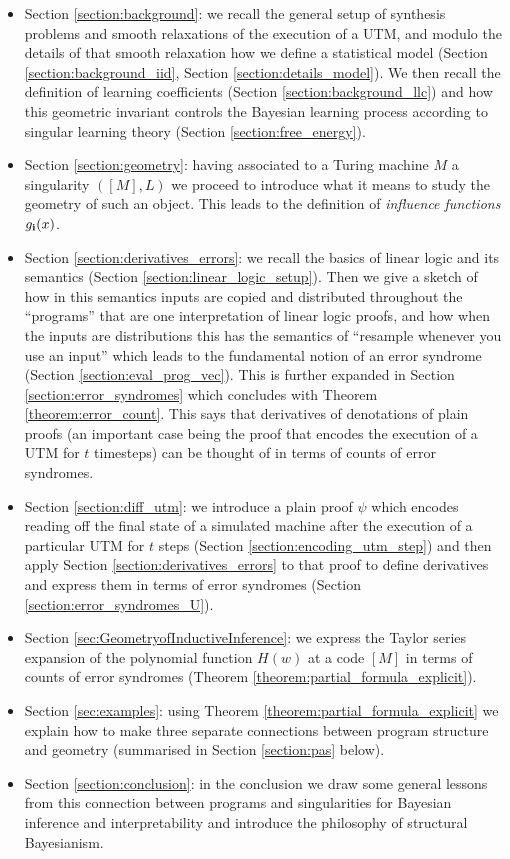 \documentclass[english,letter paper,12pt,reqno]{article}
\theoremstyle{definition}
\begin{document}
\begin{itemize}
    \item Section \ref{section:background}: we recall the general setup of synthesis problems and smooth relaxations of the execution of a UTM, and modulo the details of that smooth relaxation how we define a statistical model (Section \ref{section:background_iid}, Section \ref{section:details_model}). We then recall the definition of learning coefficients (Section \ref{section:background_llc}) and how this geometric invariant controls the Bayesian learning process according to singular learning theory (Section \ref{section:free_energy}).
    \item Section \ref{section:geometry}: having associated to a Turing machine $M$ a singularity $([M], L)$ we proceed to introduce what it means to study the geometry of such an object. This leads to the definition of \emph{influence functions} $g_{\bold{i}}(x)$.
    \item Section \ref{section:derivatives_errors}: we recall the basics of linear logic and its semantics (Section \ref{section:linear_logic_setup}). Then we give a sketch of how in this semantics inputs are copied and distributed throughout the ``programs'' that are one interpretation of linear logic proofs, and how when the inputs are distributions this has the semantics of ``resample whenever you use an input'' which leads to the fundamental notion of an error syndrome (Section \ref{section:eval_prog_vec}). This is further expanded in Section \ref{section:error_syndromes} which concludes with Theorem \ref{theorem:error_count}. This says that derivatives of denotations of plain proofs (an important case being the proof that encodes the execution of a UTM for $t$ timesteps) can be thought of in terms of counts of error syndromes.
    \item Section \ref{section:diff_utm}: we introduce a plain proof $\psi$ which encodes reading off the final state of a simulated machine after the execution of a particular UTM for $t$ steps (Section \ref{section:encoding_utm_step}) and then apply Section \ref{section:derivatives_errors} to that proof to define derivatives and express them in terms of error syndromes (Section \ref{section:error_syndromes_U}).
    \item Section \ref{sec:GeometryofInductiveInference}: we express the Taylor series expansion of the polynomial function $H(w)$ at a code $[M]$ in terms of counts of error syndromes (Theorem \ref{theorem:partial_formula_explicit}).
    \item Section \ref{sec:examples}: using Theorem \ref{theorem:partial_formula_explicit} we explain how to make three separate connections between program structure and geometry (summarised in Section \ref{section:pas} below).
    \item Section \ref{section:conclusion}: in the conclusion we draw some general lessons from this connection between programs and singularities for Bayesian inference and interpretability and introduce the philosophy of structural Bayesianism.
\end{itemize} 
\end{document}
